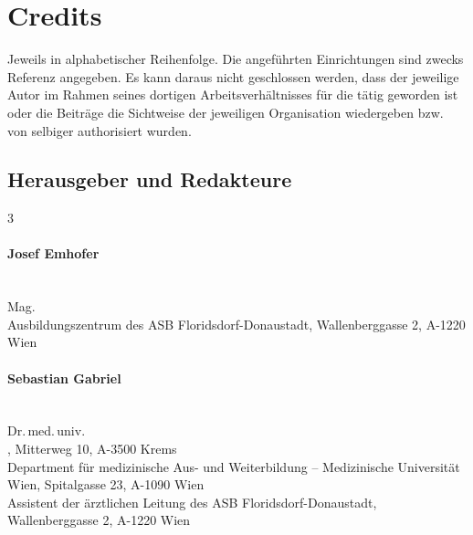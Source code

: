 \section{Credits}
\begin{WidePar}\begin{raggedright}\FontSansNarrowFamily
{\tiny\itshape\begin{center}
{Jeweils in alphabetischer Reihenfolge. Die angeführten Einrichtungen
sind zwecks Referenz angegeben. Es kann daraus nicht geschlossen werden, dass
der jeweilige Autor im Rahmen seines dortigen Arbeitsverhältnisses für die
{\AASS} tätig geworden ist oder die Beiträge die Sichtweise der jeweiligen
Organisation wiedergeben bzw. von selbiger authorisiert wurden.}
\end{center}}

\subsection*{Herausgeber und Redakteure}

\begin{multicols}{3}\small
  \begin{minipage}{\linewidth}\raggedright
    \paragraph{Josef Emhofer}~~\\
    Mag.
    \\[.25\baselineskip]
    \noindent{}Ausbildungszentrum des {\color{AltBlueDark}ASB
    Florids\-dorf-Donaustadt}, Wallenberggasse 2, A-1220
    Wien
  \end{minipage}

  \bigskip

  \begin{minipage}{\linewidth}\raggedright
    \paragraph{Sebastian Gabriel}~~\\
    Dr.\,med.\,univ.
    \\[.25\baselineskip]
    , Mitterweg 10,
    A-3500 Krems
    \\[.25\baselineskip]
    \noindent{}Department für medizinische Aus- und
    Weiterbildung -- {\color{AltBlueDark}Medizinische Universität Wien},
    Spitalgasse 23, A-1090 Wien
    \\[.25\baselineskip]
    \noindent{}Assistent der ärztlichen
    Leitung des {\color{AltBlueDark}ASB
    Florids\-dorf-Donau\-stadt}, Wallenberggasse 2, A-1220 Wien
  \end{minipage}


\end{multicols}
\end{raggedright}
\end{WidePar}
